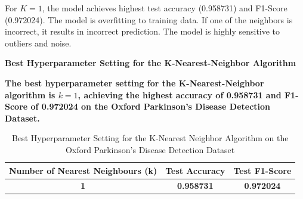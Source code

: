 \documentclass{article}
\begin{document}
\vspace{0.3cm}
For $K = 1$, the model achieves highest test accuracy (0.958731) and F1-Score (0.972024). The model is overfitting to training data. If one of the neighbors is incorrect, it results in incorrect prediction. The model is highly sensitive to outliers and noise.

\vspace{0.3cm}

\large{\textbf{Best Hyperparameter Setting for the K-Nearest-Neighbor Algorithm}} \\
\vspace{0.3cm}

\textbf{The best hyperparameter setting for the K-Nearest-Neighbor algorithm
is $k = 1$, achieving the highest accuracy of \textbf{0.958731} and
F1-Score of \textbf{0.972024} on the Oxford Parkinson's Disease
Detection Dataset.}

\begin{table}[H]
\centering
\large
\renewcommand{\arraystretch}{1.5}
\setlength{\tabcolsep}{20pt}
\begin{tabular}{|c|c|c|}
\hline
\textbf{Number of Nearest Neighbours (k)} & \textbf{Test Accuracy} & \textbf{Test F1-Score} \\
\hline
\textbf{1} & \textbf{0.958731} & \textbf{0.972024} \\
\hline
\end{tabular}
\caption{Best Hyperparameter Setting for the K-Nearest Neighbor
Algorithm on the Oxford Parkinson's Disease Detection Dataset}
\label{tab:knn_best_parkinsons}
\end{table}


\vspace{0.3cm}


\\
\end{document}
